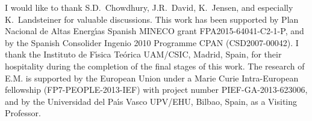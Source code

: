 \documentclass[epj]{webofc}
\begin{document}
\begin{acknowledgement}
I would like to thank S.D.~Chowdhury, J.R.~David, K.~Jensen, and especially K.~Landsteiner for valuable discussions.  This work has been supported by Plan Nacional de Altas Energ\'{\i}as Spanish MINECO grant FPA2015-64041-C2-1-P, and by the Spanish Consolider Ingenio 2010 Programme CPAN (CSD2007-00042). I thank the Instituto de F\'{\i}sica Te\'orica UAM/CSIC, Madrid, Spain, for their hospitality during the completion of the final stages of this work. The research of E.M. is supported by the European Union under a Marie Curie Intra-European fellowship (FP7-PEOPLE-2013-IEF) with project number PIEF-GA-2013-623006, and by the Universidad del Pa\'{\i}s Vasco UPV/EHU, Bilbao, Spain, as a Visiting Professor.
\end{acknowledgement}
\end{document}

